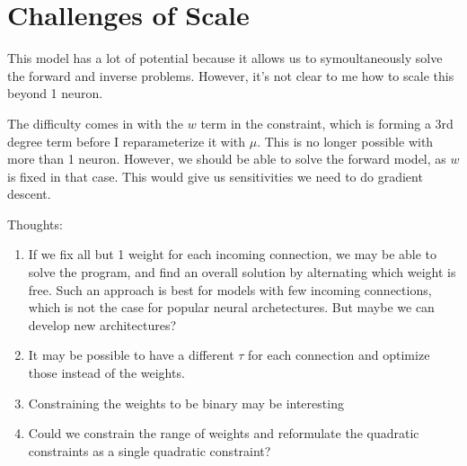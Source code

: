\documentclass[a4paper]{article}
\begin{document}
\section{Challenges of Scale}

This model has a lot of potential because it allows us to symoultaneously solve the forward and inverse problems. However, it's not clear to me how to scale this beyond 1 neuron.

The difficulty comes in with the $w$ term in the constraint, which is forming a 3rd degree term before I reparameterize it with $\mu$. This is no longer possible with more than 1 neuron. However, we should be able to solve the forward model, as $w$ is fixed in that case. This would give us sensitivities we need to do gradient descent.

Thoughts:

\begin{enumerate}
    \item If we fix all but 1 weight for each incoming connection, we may be able to solve the program, and find an overall solution by alternating which weight is free. Such an approach is best for models with few incoming connections, which is not the case for popular neural archetectures. But maybe we can develop new architectures?
    \item It may be possible to have a different $\tau$ for each connection and optimize those instead of the weights.
    \item Constraining the weights to be binary may be interesting
    \item Could we constrain the range of weights and reformulate the quadratic constraints as a single quadratic constraint?
\end{enumerate}
\end{document}
